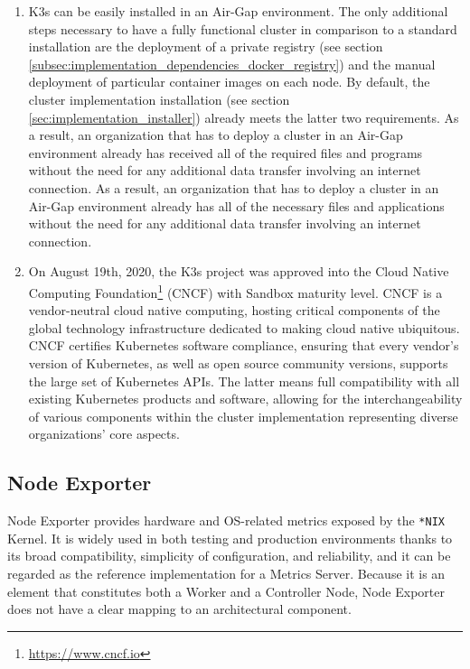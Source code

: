 \begin{enumerate}
  \item K3s can be easily installed in an Air-Gap environment. The only
    additional steps necessary to have a fully functional cluster in comparison
    to a standard installation are the deployment of a private registry (see section
    \ref{subsec:implementation_dependencies_docker_registry}) and the manual
    deployment of particular container images on each node\cite{k3s_airgap}.
    \newline
    By default, the cluster implementation installation (see section
    \ref{sec:implementation_installer}) already meets the latter two requirements.
    As a result, an organization that has to deploy a cluster in an Air-Gap environment
    already has received all of the required files and programs without the need
    for any additional data transfer involving an internet connection. As a
    result, an organization that has to deploy a cluster in an Air-Gap environment
    already has all of the necessary files and applications without the need for
    any additional data transfer involving an internet connection.

  \item On August 19th, 2020, the K3s project was approved into the Cloud Native
    Computing Foundation\footnote{\url{https://www.cncf.io}} (CNCF) with Sandbox
    maturity level\cite{cncf_k3s}. CNCF is a vendor-neutral cloud native computing,
    hosting critical components of the global technology infrastructure
    dedicated to making cloud native ubiquitous\cite{cncf}. CNCF certifies
    Kubernetes software compliance, ensuring that every vendor's version of Kubernetes,
    as well as open source community versions, supports the large set of Kubernetes
    APIs\cite{cncf_conformance}. The latter means full compatibility with all existing
    Kubernetes products and software, allowing for the interchangeability of
    various components within the cluster implementation representing diverse
    organizations' core aspects.
\end{enumerate}

\subsection{Node Exporter}
\label{subsec:implementation_dependencies_node_exporter}

Node Exporter provides hardware and OS-related metrics exposed by the \texttt{*NIX}
Kernel\cite{node_exporter}. It is widely used in both testing and production
environments thanks to its broad compatibility, simplicity of configuration, and
reliability, and it can be regarded as the reference implementation for a Metrics
Server. Because it is an element that constitutes both a Worker and a Controller
Node, Node Exporter does not have a clear mapping to an architectural component.


